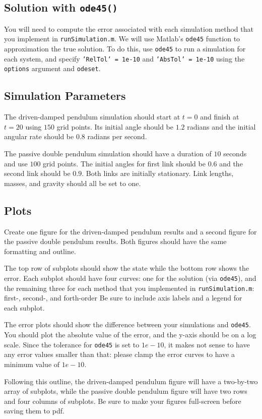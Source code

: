 \subsection*{Solution with \texttt{ode45()}}

You will need to compute the error associated with each
simulation method that you implement in \texttt{runSimulation.m}.
We will use Matlab's \texttt{ode45} function to approximation the true solution.
To do this, use \texttt{ode45} to run a simulation for each system, and
specify \texttt{'RelTol' = 1e-10} and \texttt{'AbsTol' = 1e-10}
using the \texttt{options} argument and \texttt{odeset}.

\subsection*{Simulation Parameters}

The driven-damped pendulum simulation should
start at $t = 0$ and finish at $t = 20$ using $150$ grid points.
Its initial angle should be $1.2$ radians and the
initial angular rate should be $0.8$ radians per second.

The passive double pendulum simulation should have a
duration of $10$ seconds and use $100$ grid points.
The initial angles for first link should be $0.6$
and the second link should be $0.9$.
Both links are initially stationary.
Link lengths, masses, and gravity should all be set to one.

\subsection*{Plots}

Create one figure for the driven-damped pendulum results and a
second figure for the passive double pendulum results.
Both figures should have the same formatting and outline.

\par
The top row of subplots should show the state while the bottom row shows the error.
Each subplot should have four curves: one for the solution (via \texttt{ode45}),
and the remaining three for each method that you implemented in
\texttt{runSimulation.m}: first-, second-, and forth-order
Be sure to include axis labels and a legend for each subplot.

\par The error plots should show the difference between your simulations and \texttt{ode45}.
You should plot the absolute value of the error, and the y-axis should be on a log scale.
Since the tolerance for \texttt{ode45} is set to $1e-10$, it makes not sense to have
any error values smaller than that: please clamp the error curves to have a minimum value of $1e-10$.

\par Following this outline,
the driven-damped pendulum figure will have a two-by-two
array of subplots, while the passive double pendulum figure will have
two rows and four columns of subplots.
Be sure to make your figures full-screen before saving them to pdf.


